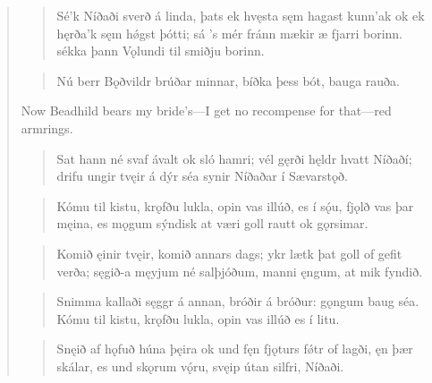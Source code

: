 \begin{verse}
\begin{verse}
\bva Sé'k Níðaði \hld sverð á linda,
þats ek hvęsta \hld sęm hagast kunn'ak
ok ek hęrða'k \hld sęm hǿgst þótti;
sá 's mér fránn mækir \hld æ fjarri borinn.
sékka þann Vǫlundi \hld til smiðju borinn. \\%
\end{verse}


\begin{verse}
\bva Nú berr Bǫðvildr \hld brúðar minnar,
bíðka þess bót, \hld bauga rauða. \\%
\end{verse}

\bvb Now Beadhild bears my bride's—I get no recompense for that—red armrings.

\begin{verse}
\bva Sat hann né svaf ávalt \hld ok sló hamri;
vél gęrði hęldr \hld hvatt Níðaðí;
drifu ungir tvęir \hld á dýr séa
synir Níðaðar \hld í Sævarstǫð. \\%
\end{verse}


\begin{verse}
\bva Kómu til kistu, \hld krǫfðu lukla,
opin vas illúð, \hld es í sǫ́u,
fjǫlð vas þar męina, \hld es mǫgum sýndisk
at væri goll rautt \hld ok gǫrsimar. \\%
\end{verse}


\begin{verse}
\bva Komið ęinir tvęir, \hld komið annars dags;
ykr lætk þat goll \hld of gefit verða;
sęgið-a męyjum \hld né salþjóðum,
manni ęngum, \hld at mik fyndið. \\%
\end{verse}


\begin{verse}
\bva Snimma kallaði \hld sęggr á annan,
bróðir á bróður: \hld gǫngum baug séa.
Kómu til kistu, \hld krǫfðu lukla,
opin vas illúð \hld es í litu. \\%
\end{verse}


\begin{verse}
\bva Snęið af hǫfuð \hld húna þęira
ok und fęn fjǫturs \hld fǿtr of lagði,
ęn þær skálar, \hld es und skǫrum vǫ́ru,
svęip útan silfri,  Níðaði. \\%
\end{verse}


\end{verse}
